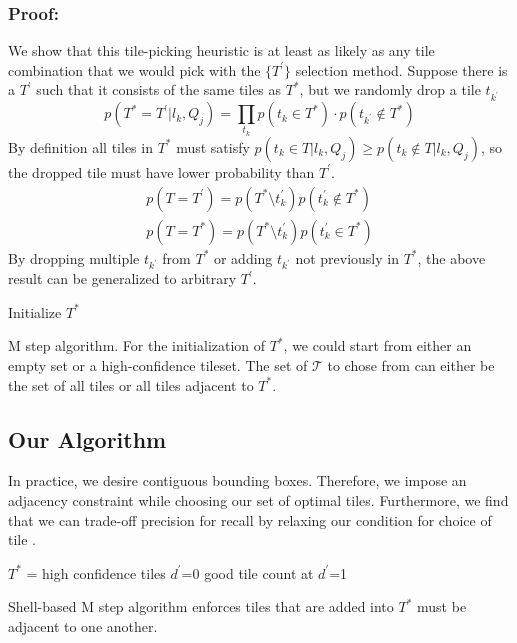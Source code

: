 \documentclass[letterpaper]{article} %
\begin{document}
\subsubsection{Proof:}
We show that this tile-picking heuristic is at least as likely as any tile combination that we would pick with the $\{T^{\prime}\}$ selection method. Suppose there is a $T^\prime$ such that it consists of the same tiles as $T^*$, but we randomly drop a tile $t_{k^\prime}$
\begin{equation}
p(T^*=T^\prime|l_k,Q_j)=\prod_{t_k} p(t_k\in T^*)\cdot p(t_{k^\prime}\notin T^*)
\end{equation}
By definition all tiles in $T^*$ must satisfy $p(t_k\in T|l_k,Q_j)\geq p(t_k\notin T|l_k,Q_j)$, so the dropped tile must have lower probability than $T^\prime$.
\begin{align}
p(T=T^\prime)=p(T^*\setminus t_k^\prime) p(t_k^\prime \notin T^*) \\
% 
% 
p(T=T^*)=p(T^*\setminus t_k^\prime) p(t_k^\prime \in T^*) 
\end{align}
By dropping multiple $t_{k^\prime}$ from $T^*$ or adding $t_{k^\prime}$ not previously in $T^*$, the above result can be generalized to arbitrary $T^\prime$.
\begin{algorithm}[ht!]
 Initialize $T^*$\;
 \caption{M step algorithm. For the initialization of $T^*$, we could start from either an empty set or a high-confidence tileset. The set of $\mathcal{T}$ to chose from can either be the set of all tiles or all tiles adjacent to $T^*$. }\label{Mstep}
\end{algorithm}

\subsection{Our Algorithm}
In practice, we desire contiguous bounding boxes. Therefore, we impose an adjacency constraint while choosing our set of optimal tiles. Furthermore, we find that we can trade-off precision for recall by relaxing our condition for choice of tile .
\begin{algorithm}[ht!]
 $T^*$ = high confidence tiles\;
 $d^\prime$=0\;
 good tile count at $d^\prime$=1\;
 \caption{Shell-based M step algorithm enforces tiles that are added into $T^*$ must be adjacent to one another.}\label{Mstep}
\end{algorithm}
\end{document}
